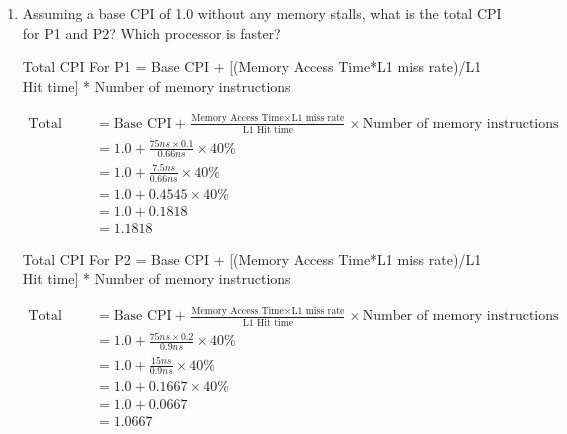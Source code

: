 \documentclass[11pt]{article}
\newenvironment{qparts}{\begin{enumerate}[{(}a{)}]}{\end{enumerate}}
\begin{document}
\begin{qparts}
    Average Memory Access Time For P2 = L1 hit time + (L1 miss rate * Memory Access Time)

    We know that the L1 hit time for P2 is 0.9ns and the L1 miss rate is 0.2. The memory access time is 75ns. Therefore, the Average Memory Access Time for P2 is 0.9ns + (0.2 * 75ns) = 0.9ns + 15ns = 15.9ns

    \item Assuming a base CPI of 1.0 without any memory stalls, what is the total CPI for P1 and P2? Which processor is faster?
    
    Total CPI For P1 = Base CPI + [(Memory Access Time*L1 miss rate)/L1 Hit time] * Number of memory instructions

  
    \begin{equation}
        \begin{aligned}
        \text{Total CPI} &= \text{Base CPI} + \frac{\text{Memory Access Time} \times \text{L1 miss rate}}{\text{L1 Hit time}} \times \text{Number of memory instructions} \\
        &= 1.0 + \frac{75ns \times 0.1}{0.66ns} \times 40\% \\
        &= 1.0 + \frac{7.5ns}{0.66ns} \times 40\% \\
        &= 1.0 + 0.4545 \times 40\% \\
        &= 1.0 + 0.1818 \\
        &= 1.1818
        \end{aligned}
    \end{equation}

    Total CPI For P2 = Base CPI + [(Memory Access Time*L1 miss rate)/L1 Hit time] * Number of memory instructions

    \begin{equation}
        \begin{aligned}
        \text{Total CPI} &= \text{Base CPI} + \frac{\text{Memory Access Time} \times \text{L1 miss rate}}{\text{L1 Hit time}} \times \text{Number of memory instructions} \\
        &= 1.0 + \frac{75ns \times 0.2}{0.9ns} \times 40\% \\
        &= 1.0 + \frac{15ns}{0.9ns} \times 40\% \\
        &= 1.0 + 0.1667 \times 40\% \\
        &= 1.0 + 0.0667 \\
        &= 1.0667
        \end{aligned}
    \end{equation}

\end{qparts}
\end{document}
